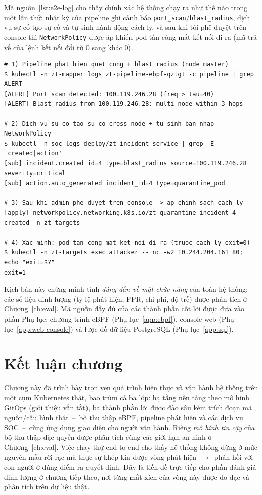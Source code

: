 Mã nguồn~\ref{lst:e2e-log} cho thấy chính xác hệ thống chạy ra như thế nào trong một
lần thử: nhật ký của pipeline ghi cảnh báo \texttt{port\_scan}/\texttt{blast\_radius},
dịch vụ sự cố tạo sự cố và tự sinh hành động cách ly, và sau khi tôi phê duyệt trên
console thì \texttt{NetworkPolicy} được áp khiến pod tấn công mất kết nối đi ra (mã trả
về của lệnh kết nối đổi từ $0$ sang khác $0$).

\begin{lstlisting}[language={},caption={Nhật ký một lần chạy thử end-to-end (rút gọn từ sự cố \#4 thật trên cụm).},label={lst:e2e-log}]
# 1) Pipeline phat hien quet cong + blast radius (node master)
$ kubectl -n zt-mapper logs zt-pipeline-ebpf-qztgt -c pipeline | grep ALERT
[ALERT] Port scan detected: 100.119.246.28 (freq > tau=40)
[ALERT] Blast radius from 100.119.246.28: multi-node within 3 hops

# 2) Dich vu su co tao su co cross-node + tu sinh ban nhap NetworkPolicy
$ kubectl -n soc logs deploy/zt-incident-service | grep -E 'created|action'
[sub] incident.created id=4 type=blast_radius source=100.119.246.28 severity=critical
[sub] action.auto_generated incident_id=4 type=quarantine_pod

# 3) Sau khi admin phe duyet tren console -> ap chinh sach cach ly
[apply] networkpolicy.networking.k8s.io/zt-quarantine-incident-4 created -n zt-targets

# 4) Xac minh: pod tan cong mat ket noi di ra (truoc cach ly exit=0)
$ kubectl -n zt-targets exec attacker -- nc -w2 10.244.204.161 80; echo "exit=$?"
exit=1
\end{lstlisting}

Kịch bản này chứng minh tính \emph{đúng đắn về mặt chức năng} của toàn hệ thống; các số
liệu định lượng (tỷ lệ phát hiện, FPR, chi phí, độ trễ) được phân tích ở
Chương~\ref{ch:eval}. Mã nguồn đầy đủ của các thành phần cốt lõi được đưa vào phần Phụ
lục: chương trình eBPF (Phụ lục~\ref{app:ebpf}), console web (Phụ
lục~\ref{app:web-console}) và lược đồ dữ liệu PostgreSQL (Phụ lục~\ref{app:sql}).

\section{Kết luận chương}

Chương này đã trình bày trọn vẹn quá trình hiện thực và vận hành hệ thống trên một cụm
Kubernetes thật, bao trùm cả ba lớp: hạ tầng nền tảng theo mô hình GitOps (giới thiệu
vắn tắt), ba thành phần lõi được đào sâu kèm trích đoạn mã nguồn/cấu hình thật~--~bộ
thu thập eBPF, pipeline phát hiện và các dịch vụ SOC~--~cùng ứng dụng giao diện cho
người vận hành. Riêng \emph{mô hình tin cậy} của bộ thu thập đặc quyền được phân tích
cùng các giới hạn an ninh ở Chương~\ref{ch:eval}.
Việc chạy thử end-to-end cho thấy hệ thống không dừng ở mức nguyên mẫu rời rạc mà thực
sự khép kín được vòng phát hiện~$\rightarrow$~phản hồi với con người ở đúng điểm ra
quyết định. Đây là tiền đề trực tiếp cho phần đánh giá định lượng ở chương tiếp theo,
nơi từng mắt xích của vòng này được đo đạc và phân tích trên dữ liệu thật.

